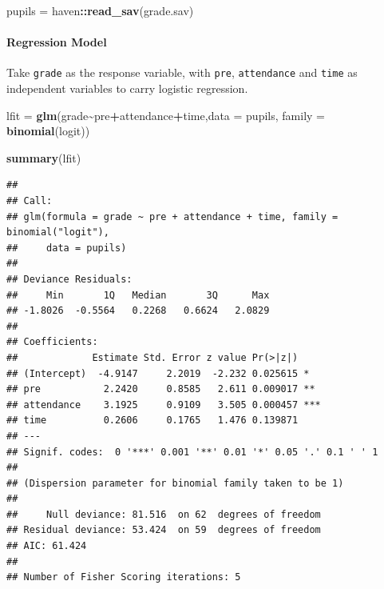 \documentclass[
]{ctexart}
\newenvironment{Shaded}{\begin{snugshade}}{\end{snugshade}}
\newcommand{\AttributeTok}[1]{\textcolor[rgb]{0.13,0.29,0.53}{#1}}
\newcommand{\FunctionTok}[1]{\textcolor[rgb]{0.13,0.29,0.53}{\textbf{#1}}}
\newcommand{\NormalTok}[1]{#1}
\newcommand{\OtherTok}[1]{\textcolor[rgb]{0.56,0.35,0.01}{#1}}
\newcommand{\SpecialCharTok}[1]{\textcolor[rgb]{0.81,0.36,0.00}{\textbf{#1}}}
\newcommand{\StringTok}[1]{\textcolor[rgb]{0.31,0.60,0.02}{#1}}
\begin{document}
\begin{Shaded}
\begin{Highlighting}[]
\NormalTok{pupils }\OtherTok{=}\NormalTok{ haven}\SpecialCharTok{::}\FunctionTok{read\_sav}\NormalTok{(}\StringTok{\textquotesingle{}grade.sav\textquotesingle{}}\NormalTok{)}
\end{Highlighting}
\end{Shaded}

\hypertarget{regression-model}{%
\paragraph{Regression Model}\label{regression-model}}

Take \texttt{grade} as the response variable, with \texttt{pre},
\texttt{attendance} and \texttt{time} as independent variables to carry
logistic regression.

\begin{Shaded}
\begin{Highlighting}[]
\NormalTok{lfit }\OtherTok{=} \FunctionTok{glm}\NormalTok{(grade}\SpecialCharTok{\textasciitilde{}}\NormalTok{pre}\SpecialCharTok{+}\NormalTok{attendance}\SpecialCharTok{+}\NormalTok{time,}\AttributeTok{data =}\NormalTok{ pupils,}
           \AttributeTok{family =} \FunctionTok{binomial}\NormalTok{(}\StringTok{\textquotesingle{}logit\textquotesingle{}}\NormalTok{))}

\FunctionTok{summary}\NormalTok{(lfit)}
\end{Highlighting}
\end{Shaded}

\begin{verbatim}
## 
## Call:
## glm(formula = grade ~ pre + attendance + time, family = binomial("logit"), 
##     data = pupils)
## 
## Deviance Residuals: 
##     Min       1Q   Median       3Q      Max  
## -1.8026  -0.5564   0.2268   0.6624   2.0829  
## 
## Coefficients:
##             Estimate Std. Error z value Pr(>|z|)    
## (Intercept)  -4.9147     2.2019  -2.232 0.025615 *  
## pre           2.2420     0.8585   2.611 0.009017 ** 
## attendance    3.1925     0.9109   3.505 0.000457 ***
## time          0.2606     0.1765   1.476 0.139871    
## ---
## Signif. codes:  0 '***' 0.001 '**' 0.01 '*' 0.05 '.' 0.1 ' ' 1
## 
## (Dispersion parameter for binomial family taken to be 1)
## 
##     Null deviance: 81.516  on 62  degrees of freedom
## Residual deviance: 53.424  on 59  degrees of freedom
## AIC: 61.424
## 
## Number of Fisher Scoring iterations: 5
\end{verbatim}
\end{document}
